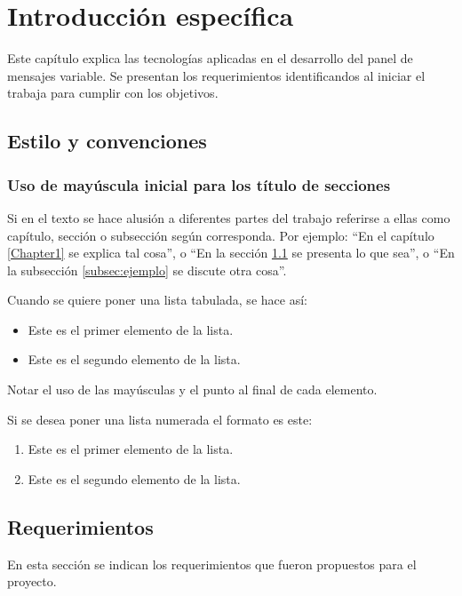 \chapter{Introducción específica} %

\label{Chapter2}

Este capítulo explica las tecnologías aplicadas en el desarrollo del panel de mensajes variable. Se presentan los requerimientos identificandos al iniciar el trabaja para cumplir con los objetivos.

\section{Estilo y convenciones}
\label{sec:ejemplo}

\subsection{Uso de mayúscula inicial para los título de secciones}

Si en el texto se hace alusión a diferentes partes del trabajo referirse a ellas como capítulo, sección o subsección según corresponda. Por ejemplo: ``En el capítulo \ref{Chapter1} se explica tal cosa'', o ``En la sección \ref{sec:ejemplo} se presenta lo que sea'', o ``En la subsección \ref{subsec:ejemplo} se discute otra cosa''.

Cuando se quiere poner una lista tabulada, se hace así:

\begin{itemize}
	\item Este es el primer elemento de la lista.
	\item Este es el segundo elemento de la lista.
\end{itemize}

Notar el uso de las mayúsculas y el punto al final de cada elemento.

Si se desea poner una lista numerada el formato es este:

\begin{enumerate}
	\item Este es el primer elemento de la lista.
	\item Este es el segundo elemento de la lista.
\end{enumerate}
\section{Requerimientos}
En esta sección se indican los requerimientos que fueron propuestos para el proyecto.

